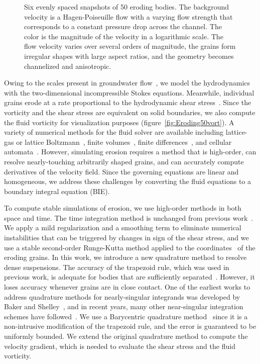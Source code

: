 \documentclass{jfm}
\begin{document}
\begin{figure}
\begin{center}
\caption{\label{fig:Eroding50vel} Six evenly spaced snapshots of 50
eroding bodies.  The background velocity is a Hagen-Poiseuille flow with
a varying flow strength that corresponds to a constant pressure drop
across the channel. The color is the magnitude of the velocity in a
logarithmic scale. The flow velocity varies over several orders of
magnitude, the grains form irregular shapes with large aspect ratios,
and the geometry becomes channelized and anisotropic.}
\end{center}
\end{figure}

Owing to the scales present in groundwater flow~\citep{bea1972}, we model
the hydrodynamics with the two-dimensional incompressible Stokes
equations.  Meanwhile, individual grains erode at a rate proportional to
the hydrodynamic shear stress~\citep{wan-fel2004,
ris-moo-chi-she-zha2012, moore2013self, par-izu2000}.  Since the
vorticity and the shear stress are equivalent on solid boundaries, we
also compute the fluid vorticity for visualization purposes
(figure~\ref{fig:Eroding50vort}).  A variety of numerical methods for
the fluid solver are available including lattice-gas or lattice
Boltzmann~\citep{kop-kat-tim1996, dar-mcc1998}, finite
volumes~\citep{suo-liu-gan2019, den-ica-hid2018,
sie-ili-pri-riv-gua2019}, finite differences~\citep{leb-ded-dav-bou2007,
knu-car2005}, and cellular automata~\citep{rot1988}.  However, simulating
erosion requires a method that is high-order, can resolve
nearly-touching arbitrarily shaped grains, and can accurately compute
derivatives of the velocity field.  Since the governing equations are
linear and homogeneous, we address these challenges by converting the
fluid equations to a boundary integral equation (BIE).

To compute stable simulations of erosion, we use high-order methods in
both space and time. The time integration method is unchanged from
previous work~\citep{qua-moo2018}.  We apply a mild regularization and a
smoothing term to eliminate numerical instabilities that can be triggered by changes in
sign of the shear stress, and we use a stable second-order Runge-Kutta
method applied to the {\thL} coordinates~\citep{hou-low-she1994} of the
eroding grains.  In this work, we introduce a new quadrature method to
resolve dense suspensions.  The accuracy of the
trapezoid rule, which was used in previous work, is adequate for
bodies that are sufficiently separated~\citep{tre-wei2014}.  However, it
loses accuracy whenever grains are in close contact.  One of the
earliest works to address quadrature methods for nearly-singular
integrands was developed by Baker and Shelley~\citep{bak-she1986}, and in
recent years, many other near-singular integration schemes have
followed~\citep{oja-tor2015, kli-tor2018, hel-oja2008a, bea-yin-wil2016,
bea-lai2001, klo-bar-gre-one2013}.  We use a Barycentric quadrature
method~\citep{bar2014, bar-wu-vee2015} since it is a non-intrusive
modification of the trapezoid rule, and the error is guaranteed to be
uniformly bounded.  We extend the original quadrature method to compute
the velocity gradient, which is needed to evaluate the shear stress and
the fluid vorticity.
\end{document}
